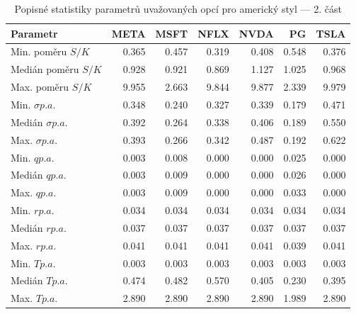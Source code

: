 \documentclass[male,czech,api_bc]{kitheses}
\begin{document}
  \begin{table}[h!]
    \centering
    \caption{Popisné statistiky parametrů uvažovaných opcí pro americký styl — 2. část}
    \label{tab:descriptive_american_2}
    \begin{tabular}{lrrrrrr}
      \toprule
      Parametr & META & MSFT & NFLX & NVDA & PG & TSLA \\
      \midrule
      Min. poměru $S/K$ & 0.365 & 0.457 & 0.319 & 0.408 & 0.548 & 0.376 \\
      Medián poměru $S/K$ & 0.928 & 0.921 & 0.869 & 1.127 & 1.025 & 0.968 \\
      Max. poměru $S/K$ & 9.955 & 2.663 & 9.844 & 9.877 & 2.339 & 9.979 \\
      \midrule
      Min. $\sigma p.a.$ & 0.348 & 0.240 & 0.327 & 0.339 & 0.179 & 0.471 \\
      Medián $\sigma p.a.$ & 0.392 & 0.264 & 0.338 & 0.406 & 0.189 & 0.550 \\
      Max. $\sigma p.a.$ & 0.393 & 0.266 & 0.342 & 0.487 & 0.192 & 0.622 \\
      \midrule
      Min. $q p.a.$ & 0.003 & 0.008 & 0.000 & 0.000 & 0.025 & 0.000 \\
      Medián $q p.a.$ & 0.003 & 0.009 & 0.000 & 0.000 & 0.026 & 0.000 \\
      Max. $q p.a.$ & 0.003 & 0.009 & 0.000 & 0.000 & 0.033 & 0.000 \\
      \midrule
      Min. $r p.a.$ & 0.034 & 0.034 & 0.034 & 0.034 & 0.034 & 0.034 \\
      Medián $r p.a.$ & 0.037 & 0.037 & 0.037 & 0.037 & 0.037 & 0.037 \\
      Max. $r p.a.$ & 0.041 & 0.041 & 0.041 & 0.041 & 0.039 & 0.041 \\
      \midrule
      Min. $T p.a.$ & 0.003 & 0.003 & 0.003 & 0.003 & 0.003 & 0.003 \\
      Medián $T p.a.$ & 0.474 & 0.482 & 0.570 & 0.405 & 0.230 & 0.395 \\
      Max. $T p.a.$ & 2.890 & 2.890 & 2.890 & 2.890 & 1.989 & 2.890 \\
      \bottomrule
    \end{tabular}
  \end{table}
\end{document}
